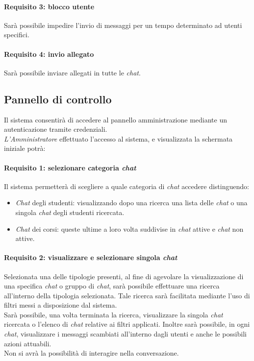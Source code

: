 \paragraph{Requisito 3: blocco utente\\}
Sarà possibile impedire l’invio di messaggi per un tempo determinato ad utenti specifici.

\paragraph{Requisito 4: invio allegato\\}
Sarà possibile inviare allegati in tutte le \emph{chat}.


\subsection{Pannello di controllo}
Il sistema consentirà di accedere al pannello amministrazione mediante un autenticazione tramite credenziali.\\
\emph{L’Amministratore} effettuato l’accesso al sistema, e visualizzata la schermata iniziale potrà:

\paragraph{Requisito 1: selezionare categoria \emph{chat}\\}
Il sistema permetterà di scegliere a quale categoria di \emph{chat} accedere distinguendo: 
\begin{itemize}
\item \emph{Chat} degli studenti: visualizzando dopo una ricerca una lista delle \emph{chat} o una singola \emph{chat} degli studenti ricercata.
\item \emph{Chat} dei corsi: queste ultime a loro volta suddivise in \emph{chat} attive e \emph{chat} non attive.
\end{itemize}

\paragraph{Requisito 2: visualizzare e selezionare singola \emph{chat}\\}
Selezionata una delle tipologie presenti, al fine di agevolare la visualizzazione di una specifica \emph{chat} o gruppo di \emph{chat}, sarà possibile effettuare una ricerca all’interno della tipologia selezionata. Tale ricerca sarà facilitata mediante l’uso di filtri messi a disposizione dal sistema.\\
Sarà possibile, una volta terminata la ricerca, visualizzare la singola \emph{chat} ricercata o l’elenco di \emph{chat} relative ai filtri applicati.
Inoltre sarà possibile, in ogni \emph{chat}, visualizzare i messaggi scambiati all’interno dagli utenti e anche le possibili azioni attuabili.\\
Non si avrà la possibilità di interagire nella conversazione.

